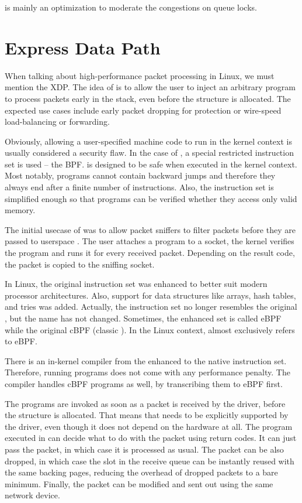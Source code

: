  is mainly an optimization to moderate the congestions on queue locks.

\section{Express Data Path}
\label{sec:xdp}

When talking about high-performance packet processing in Linux, we must
mention the \acrfull{XDP}. The idea of  is to allow the user to inject an
arbitrary program to process packets early in the stack, even before the \skb{}
structure is allocated. The expected use cases include early packet dropping
for  protection or wire-speed load-balancing or forwarding.

Obviously, allowing a user-specified machine code to run in the kernel context is
usually considered a security flaw. In the case of , a special restricted
instruction set is used -- the \acrlong{BPF}.  is designed to be safe when
executed in the kernel context. Most notably,  programs cannot contain
backward jumps and therefore they always end after a finite number of
instructions. Also, the instruction set is simplified enough so that programs
can be verified whether they access only valid memory.

The initial usecase of  was to allow packet sniffers to filter packets
before they are passed to userspace \cite{bpf-usenix}. The user attaches
a  program to a socket, the kernel verifies the program and runs it
for every received packet. Depending on the result code, the packet is copied
to the sniffing socket.

In Linux, the original  instruction set was enhanced to better suit modern
processor architectures. Also, support for data structures like arrays, hash
tables, and tries was added. Actually, the instruction set no longer resembles the original ,
but the name has not changed. Sometimes, the enhanced set is called eBPF while
the original cBPF (classic ). In the Linux context,  almost
exclusively refers to eBPF.

There is an in-kernel  compiler from the enhanced  to the native
instruction set. Therefore, running  programs does not come with any
performance penalty. The compiler handles cBPF programs as well, by
transcribing them to eBPF first.

The  programs are invoked as soon as a packet is received by the driver,
before the \skb{} structure is allocated. That means that  needs to be
explicitly supported by the driver, even though it does not depend on the hardware at all.
The program executed in  can decide what to do with the packet using return codes.
It can just pass the packet, in which case it is processed as usual. The packet
can be also dropped, in which case the slot in the receive queue can be instantly reused
with the same backing pages, reducing the overhead of dropped packets to a bare
minimum. Finally, the packet can be modified and sent out using the same
network device.

